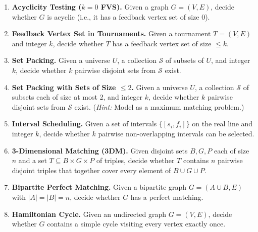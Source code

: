 \documentclass[9pt]{book}
\begin{document}
\begin{enumerate}[label=\arabic*.]
\item \textbf{Acyclicity Testing ($k=0$ FVS).}
Given a graph $G=(V,E)$, decide whether $G$ is acyclic (i.e., it has a feedback vertex set of size 0).

\bigskip

\item \textbf{Feedback Vertex Set in Tournaments.}
Given a tournament $T=(V,E)$ and integer $k$, decide whether $T$ has a feedback vertex set of size $\leq k$.

\bigskip

\item \textbf{Set Packing.}
Given a universe $U$, a collection $\mathcal{S}$ of subsets of $U$, and integer $k$, decide whether $k$ pairwise disjoint sets from $\mathcal{S}$ exist.

\bigskip

\item \textbf{Set Packing with Sets of Size $\leq 2$.}
Given a universe $U$, a collection $\mathcal{S}$ of subsets each of size at most 2, and integer $k$, decide whether $k$ pairwise disjoint sets from $\mathcal{S}$ exist.
(\textit{Hint:} Model as a maximum matching problem.)

\bigskip

\item \textbf{Interval Scheduling.}
Given a set of intervals $\{[s_i,f_i]\}$ on the real line and integer $k$, decide whether $k$ pairwise non-overlapping intervals can be selected.

\bigskip

\item \textbf{3-Dimensional Matching (3DM).}
Given disjoint sets $B,G,P$ each of size $n$ and a set $T\subseteq B\times G\times P$ of triples, decide whether $T$ contains $n$ pairwise disjoint triples that together cover every element of $B\cup G\cup P$.

\bigskip

\item \textbf{Bipartite Perfect Matching.}
Given a bipartite graph $G=(A\cup B,E)$ with $|A|=|B|=n$, decide whether $G$ has a perfect matching.

\bigskip

\item \textbf{Hamiltonian Cycle.}
Given an undirected graph $G=(V,E)$, decide whether $G$ contains a simple cycle visiting every vertex exactly once.

\bigskip


\end{enumerate}
\end{document}
